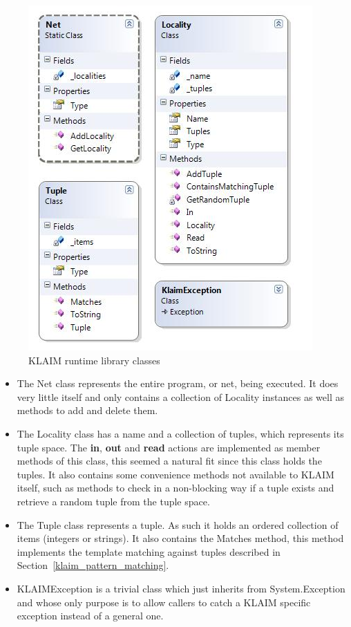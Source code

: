 	\begin{figure}[ht!]
		\centering
		\includegraphics[scale=0.8]{klaim_runtime.jpg}
		\caption{KLAIM runtime library classes}
		\label{fig:klaim_runtime}
	\end{figure}
	
	\begin{itemize}
	
	\item The \textsf{Net} class represents the entire program, or net, being 
	executed. It does very little itself and only contains a collection of 
	\textsf{Locality} instances as well as methods to add and delete them. 
	
	\item The \textsf{Locality} class has a name and a collection of tuples, 
	which 
	represents its tuple space. The \textbf{in}, \textbf{out} and \textbf{read} 
	actions are implemented as member methods of this class, this seemed a 
	natural fit since this class holds the tuples. It also contains some 
	convenience methods not available to KLAIM itself, such as methods to check 
	in a non-blocking way if a tuple exists and retrieve a random tuple from the 
	tuple space.

	\item The \textsf{Tuple} class represents a tuple. As such it holds an 
	ordered collection of items (integers or strings). It also contains the 
	\textsf{Matches} method, this method implements the template matching 
	against tuples described in Section~\ref{klaim_pattern_matching}.
	
	\item \textsf{KLAIMException} is a trivial class which just inherits from 
	\textsf{System.Exception} and whose only purpose is to allow callers to 
	catch a KLAIM specific exception instead of a general one.
	
	\end{itemize}
	
